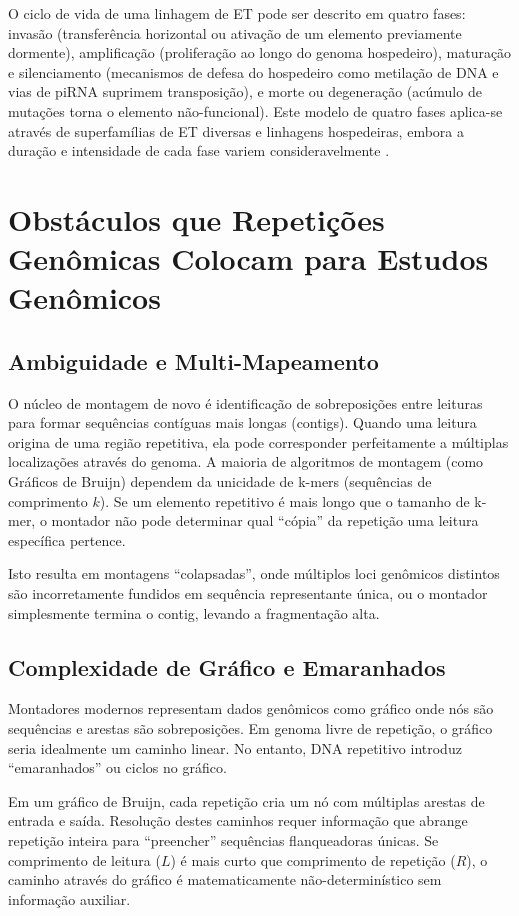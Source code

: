 O ciclo de vida de uma linhagem de ET pode ser descrito em quatro fases: invasão (transferência horizontal ou ativação de um elemento previamente dormente), amplificação (proliferação ao longo do genoma hospedeiro), maturação e silenciamento (mecanismos de defesa do hospedeiro como metilação de DNA e vias de piRNA suprimem transposição), e morte ou degeneração (acúmulo de mutações torna o elemento não-funcional). Este modelo de quatro fases aplica-se através de superfamílias de ET diversas e linhagens hospedeiras, embora a duração e intensidade de cada fase variem consideravelmente \parencite{kidwell2002}.

\section{Obstáculos que Repetições Genômicas Colocam para Estudos Genômicos}

\subsection{Ambiguidade e Multi-Mapeamento}

O núcleo de montagem de novo é identificação de sobreposições entre leituras para formar sequências contíguas mais longas (contigs). Quando uma leitura origina de uma região repetitiva, ela pode corresponder perfeitamente a múltiplas localizações através do genoma. A maioria de algoritmos de montagem (como Gráficos de Bruijn) dependem da unicidade de k-mers (sequências de comprimento $k$). Se um elemento repetitivo é mais longo que o tamanho de k-mer, o montador não pode determinar qual ``cópia'' da repetição uma leitura específica pertence.

Isto resulta em montagens ``colapsadas'', onde múltiplos loci genômicos distintos são incorretamente fundidos em sequência representante única, ou o montador simplesmente termina o contig, levando a fragmentação alta.

\subsection{Complexidade de Gráfico e Emaranhados}

Montadores modernos representam dados genômicos como gráfico onde nós são sequências e arestas são sobreposições. Em genoma livre de repetição, o gráfico seria idealmente um caminho linear. No entanto, DNA repetitivo introduz ``emaranhados'' ou ciclos no gráfico.

Em um gráfico de Bruijn, cada repetição cria um nó com múltiplas arestas de entrada e saída. Resolução destes caminhos requer informação que abrange repetição inteira para ``preencher'' sequências flanqueadoras únicas. Se comprimento de leitura ($L$) é mais curto que comprimento de repetição ($R$), o caminho através do gráfico é matematicamente não-determinístico sem informação auxiliar.

